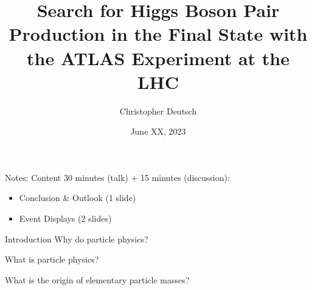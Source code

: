 \documentclass[11pt, xcolor={dvipsnames}, aspectratio=169]{beamer}
\author{Christopher Deutsch}
\institute{University of Bonn}
\date{June XX, 2023}
\title{\vspace{1.5em}Search for Higgs Boson Pair Production in the \bbtautau
  Final State with the ATLAS Experiment at the LHC}
\begin{document}
\maketitle

\begin{frame}[noframenumbering]{Notes: Content}
  30 minutes (talk) + 15 minutes (discussion):
  \begin{itemize}

  \item Conclusion \& Outlook (1 slide)

  \item Event Displays (2 slides)

  \end{itemize}
\end{frame}


\begin{frame}{Introduction}
  Why do particle physics?

  What is particle physics?

  What is the origin of elementary particle masses?
\end{frame}

\end{document}
